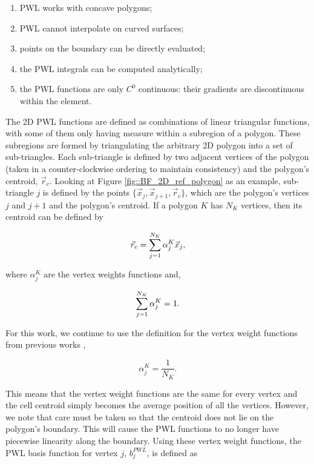 \begin{enumerate}
\item PWL works with concave polygons;
\item PWL cannot interpolate on curved surfaces;
\item points on the boundary can be directly evaluated;
\item the PWL integrals can be computed analytically;
\item the PWL functions are only $C^0$ continuous: their gradients are discontinuous within the element.
\end{enumerate}

The 2D PWL functions are defined as combinations of linear triangular functions, with some of them only having measure within a subregion of a polygon. These subregions are formed by triangulating the arbitrary 2D polygon into a set of sub-triangles. Each sub-triangle is defined by two adjacent vertices of the polygon (taken in a counter-clockwise ordering to maintain consistency) and the polygon's centroid, $\vec{r}_{c}$. Looking at Figure \ref{fig::BF_2D_ref_polygon} as an example, sub-triangle $j$ is defined by the points $\{ \vec{x}_j , \vec{x}_{j+1}, \vec{r}_c \}$, which are the polygon's vertices $j$ and $j+1$ and the polygon's centroid. If a polygon $K$ has $N_K$ vertices, then its centroid can be defined by

\begin{equation}
\label{eq::PWL_2D_centroid}
	\vec{r}_{c} =  \sum\displaylimits_{j=1}^{N_K} \alpha_{j}^{K}  \vec{x}_j ,
\end{equation}

\noindent where $\alpha_{j}^{K}$ are the vertex weights functions and, 

\begin{equation}
\label{eq::PWL_2D_vertex_weight_sum}
 \sum\displaylimits_{j=1}^{N_K} \alpha_{j}^{K} = 1.
\end{equation}

\noindent For this work, we continue to use the definition for the vertex weight functions from previous works \cite{ref::PWLD_stone_adams,ref::PWLD_stone_adams_unstructured,bailey2008phd},

\begin{equation}
\label{eq::PWL_2D_vertex_weight_val}
\alpha_{j}^{K} = \frac{1}{N_K} .
\end{equation}

\noindent This means that the vertex weight functions are the same for every vertex and the cell centroid simply becomes the average position of all the vertices. However, we note that care must be taken so that the centroid does not lie on the polygon's boundary. This will cause the PWL functions to no longer have piecewise linearity along the boundary. Using these vertex weight functions, the PWL basis function for vertex $j$, $b_j^{PWL}$, is defined as

